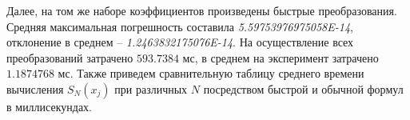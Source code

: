 Далее, на том же наборе коэффициентов произведены быстрые преобразования.
Средняя максимальная погрешность составила \textit{5.59753976975058E-14}, отклонение в среднем --  \textit{1.2463832175076E-14}.
На осуществление всех преобразований затрачено $593.7384$ мс, в среднем на эксперимент затрачено $1.1874768$ мс. Также приведем сравнительную таблицу среднего времени вычисления $S_N(x_j)$ при различных $N$ посредством быстрой и обычной формул в миллисекундах.

